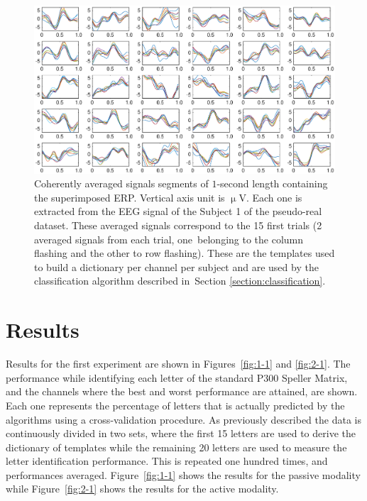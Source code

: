 \documentclass[brainsci,article,accept,moreauthors,pdftex,10pt,a4paper]{mdpi}
\begin{document}
\begin{figure}[H]
\centering
\includegraphics[width=14cm]{images/dictionary.eps}
\caption{Coherently averaged signals segments of $1$-second length containing the superimposed ERP.  Vertical axis unit is $\upmu$V.  Each one is extracted from the EEG signal of the Subject 1 of the pseudo-real dataset.  These averaged signals correspond to the 15 first trials (2 averaged signals from each trial, one~belonging to the column flashing and the other to row flashing).  These are the templates used to build a dictionary per channel per subject and are used by the classification algorithm described in~Section \ref{section:classification}.}
\label{fig:dictionaryfig}
\end{figure}


\section{Results}
\label{section:results}

Results for the first experiment are shown in Figures~\ref{fig:1-1}  and \ref{fig:2-1}. The performance while identifying each letter of the standard P300 Speller Matrix, and the channels where the best and worst performance are attained, are shown.   Each one represents the percentage of letters that is actually predicted by the algorithms using a cross-validation procedure.  As previously described the data is continuously divided in two sets, where the first 15 letters are used to derive the dictionary of templates while the remaining 20 letters are used to measure the letter identification performance. This is repeated one hundred times, and performances averaged.  Figure~\ref{fig:1-1} shows the results for the passive modality while Figure~\ref{fig:2-1} shows the results for the active modality.
\end{document}
